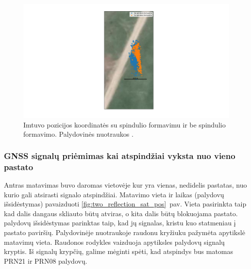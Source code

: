 \documentclass[main.tex]{subfiles}
\begin{document}
\begin{figure}[ht]
    \begin{centering}
    \hspace*{-3cm}\includegraphics[scale=0.45]{drawings/no_reflection_map}
    \par\end{centering}
    \protect\caption{\label{fig:no_reflection_map}Imtuvo pozicijos koordinatės su spindulio formavimu ir be spindulio formavimo. Palydovinės nuotraukos \cite{google_maps}.}
\end{figure}



\subsubsection{GNSS signalų priėmimas kai atspindžiai vyksta nuo vieno pastato}\label{sec:gnss_meas_one_reflection}

Antras matavimas buvo daromas vietovėje kur yra vienas, nedidelis pastatas, nuo kurio gali atsirasti
signalo atspindžiai. Matavimo vieta ir laikas (palydovų išsidėstymas) pavaizduoti \ref{fig:two_reflection_sat_pos}~pav.
Vieta pasirinkta taip kad dalis dangaus skliauto būtų atviras, o kita dalis būtų blokuojama pastato.
palydovų išsidėstymas parinktas taip, kad jų signalas, kristu kuo statmeniau į pastato paviršių.
Palydovinėje nuotraukoje raudonu kryžiuku pažymėta apytikslė matavimų vieta. Raudonos rodykles
vaizduoja apytiksles palydovų signalų kryptis. Iš signalų krypčių, galime mėginti spėti,
kad atspindys bus matomas PRN21 ir PRN08 palydovų.
\end{document}
